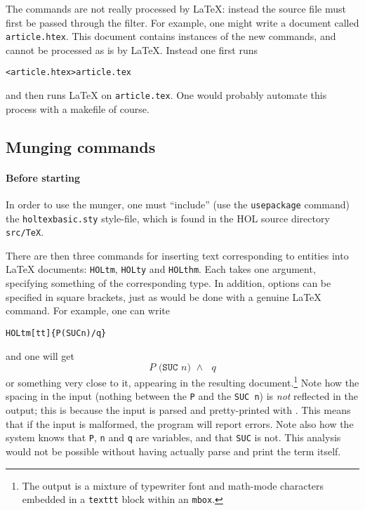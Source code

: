 The commands are not really processed by \LaTeX{}: instead the source file must first be passed through the \munge{} filter.
%
For example, one might write a document called \texttt{article.htex}.
%
This document contains instances of the new commands, and cannot be processed as is by \LaTeX{}.
%
Instead one first runs
\begin{alltt}
   \munge < article.htex > article.tex
\end{alltt}
and then runs \LaTeX{} on \texttt{article.tex}.
%
One would probably automate this process with a makefile of course.

\subsection{Munging commands}
\label{sec:munging-commands}
\newcommand{\holtm}{\texttt{\bs{}HOLtm}}
\newcommand{\holty}{\texttt{\bs{}HOLty}}
\newcommand{\holthm}{\texttt{\bs{}HOLthm}}
\paragraph{Before starting} In order to use the munger, one must ``include'' (use the \texttt{\bs{}usepackage} command) the \texttt{holtexbasic.sty} style-file, which is found in the HOL source directory \texttt{src/TeX}.

\bigskip
There are then three commands for inserting text corresponding to \HOL{} entities into \LaTeX{} documents: \holtm, \holty{} and \holthm.
%
Each takes one argument, specifying something of the corresponding \HOL{} type.
%
In addition, options can be specified in square brackets, just as would be done with a genuine \LaTeX{} command.
%
For example, one can write
\begin{alltt}
   \holtm{}[tt]\{P(SUC n) /\bs{} q\}
\end{alltt}
and one will get \[
  \texttt{$P$ (SUC $n$) $\land$ $q$}
\]
or something very close to it, appearing in the resulting document.\footnote{The output is a mixture of typewriter font and math-mode characters embedded in a \texttt{\bs{}texttt} block within an \texttt{\bs{}mbox}.}
%
Note how the spacing in the input (nothing between the \texttt{P} and the \texttt{SUC n}) is \emph{not} reflected in the output; this is because the input is parsed and pretty-printed with \HOL{}.
%
This means that if the \HOL{} input is malformed, the \munge{} program will report errors.
%
Note also how the system knows that \texttt{P}, \texttt{n} and \texttt{q} are variables, and that \texttt{SUC} is not.
%
This analysis would not be possible without having \HOL{} actually parse and print the term itself.

